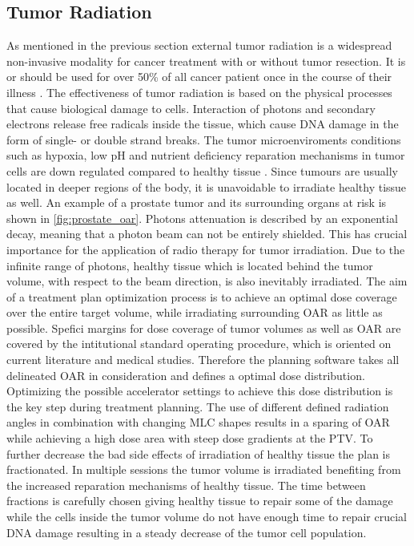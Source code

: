 \subsection{Tumor Radiation}

As mentioned in the previous section external tumor radiation is a widespread non-invasive modality for cancer treatment with or without tumor resection.
It is or should be used for over 50\% of all cancer patient once in the course of their illness \cite{delaney_role_2005}. 
The effectiveness of tumor radiation is based on the physical processes that cause biological damage to cells.
Interaction of photons and secondary electrons release free radicals inside the tissue, which cause \ac{DNA} damage in the form of single- or double strand breaks.
The tumor microenviroments conditions such as hypoxia, low pH and nutrient deficiency reparation mechanisms in tumor cells are down regulated compared to healthy tissue \cite{li_dna_2021}.
Since tumours are usually located in deeper regions of the body, it is unavoidable to irradiate healthy tissue as well. 
An example of a prostate tumor and its surrounding organs at risk is shown in \autoref{fig:prostate_oar}.
Photons attenuation is described by an exponential decay, meaning that a photon beam can not be entirely shielded.
This has crucial importance for the application of radio therapy for tumor irradiation.
Due to the infinite range of photons, healthy tissue which is located behind the tumor volume, with respect to the beam direction, is also inevitably irradiated.
The aim of a treatment plan optimization process is to achieve an optimal dose coverage over the entire target volume, while irradiating surrounding \acs{OAR} as little as possible.
Spefici margins for dose coverage of tumor volumes as well as \acs{OAR} are covered by the intitutional standard operating procedure, which is oriented on current literature and medical studies.
Therefore the planning software takes all delineated \acs{OAR} in consideration and defines a optimal dose distribution.
Optimizing the possible accelerator settings to achieve this dose distribution is the key step during treatment planning.
The use of different defined radiation angles in combination with changing \ac{MLC} shapes results in a sparing of \ac{OAR} while achieving a high dose area with steep dose gradients at the \ac{PTV}.
To further decrease the bad side effects of irradiation of healthy tissue the plan is fractionated.
In multiple sessions the tumor volume is irradiated benefiting from the increased reparation mechanisms of healthy tissue.
The time between fractions is carefully chosen giving healthy tissue to repair some of the damage while the cells inside the tumor volume do not have enough time to repair crucial \ac{DNA} damage resulting in a steady decrease of the tumor cell population.

